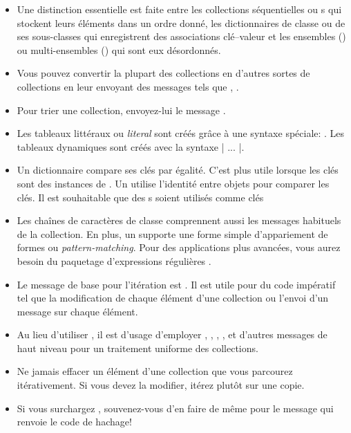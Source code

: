 \documentclass[a4paper,10pt,twoside]{book}
\begin{document}
\begin{itemize}
  \item Une distinction essentielle est faite entre les collections séquentielles ou 
s qui stockent leurs éléments dans un ordre
donné, les dictionnaires de classe  ou de ses sous-classes qui
enregistrent des associations clé--valeur et les ensembles 
() ou multi-ensembles () qui sont eux désordonnés.
  \item Vous pouvez convertir la plupart des collections en d'autres sortes de 
collections en leur envoyant des messages tels que ,  \etc.
  \item Pour trier une collection, envoyez-lui le message .
  \item Les tableaux littéraux ou \emph{literal}  sont créés 
grâce à une syntaxe spéciale: .  Les tableaux dynamiques
sont créés avec la syntaxe \ct|{ ... }|.
  \item Un dictionnaire  compare ses clés par égalité.
C'est plus utile lorsque les clés sont des instances de . 
Un  utilise l'identité entre objets pour comparer les clés. Il est souhaitable que des s soient utilisés comme clés 

  \item Les chaînes de caractères de classe  comprennent
aussi les messages habituels de la collection. En plus, un  
supporte une forme simple d'appariement de formes ou \emph{pattern-matching}. 
Pour des applications plus avancées, vous aurez besoin du paquetage d'expressions régulières .
  \item Le message de base pour l'itération est . Il est 
utile pour du code impératif tel que la modification de chaque élément d'une collection ou l'envoi d'un message sur chaque élément.
  \item Au lieu d'utiliser , il est d'usage d'employer , , , ,  et d'autres messages de haut niveau pour un traitement uniforme des collections.
  \item Ne jamais effacer un élément d'une collection que vous parcourez itérativement. Si vous devez la modifier, itérez plutôt sur une copie.
  \item Si vous surchargez \ct{=}, souvenez-vous d'en faire de même pour le message  
qui renvoie le code de hachage!
\end{itemize}

\ifx\wholebook\relax\else
   
   
\end{document}
